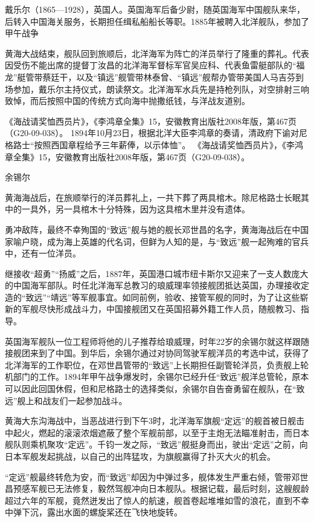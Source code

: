 \documentclass[12pt,UTF8]{ctexbook}
\begin{document}
戴乐尔（1865—1928），英国人。英国海军后备少尉，随英国海军中国舰队来华，后转入中国海关服务，长期担任缉私船船长等职。1885年被聘入北洋舰队，参加了甲午战争

黄海大战结束，舰队回到旅顺后，北洋海军为阵亡的洋员举行了隆重的葬礼。代表因受伤不能出席的提督丁汝昌的北洋海军督标军官吴应科、代表鱼雷艇部队的“福龙”艇管带蔡廷干，以及“镇远”舰管带林泰曾、“镇远”舰帮办管带美国人马吉芬到场参加，戴乐尔主持仪式，朗读祭文。北洋海军水兵先是持枪列队，对空排射三响致悼，而后按照中国的传统方式向海中抛撒纸钱，与洋战友道别。

《海战请奖恤西员片》，《李鸿章全集》15，安徽教育出版社2008年版，第467页（G20-09-038）。
1894年10月23日，根据北洋大臣李鸿章的奏请，清政府下谕对尼格路士“按照西国章程给予三年薪俸，以示体恤”。 《海战请奖恤西员片》，《李鸿章全集》15，安徽教育出版社2008年版，第467页（G20-09-038）。

余锡尔

黄海海战后，在旅顺举行的洋员葬礼上，一共下葬了两具棺木。除尼格路士长眠其中的一具外，另一具棺木十分特殊，因为这具棺木里并没有遗体。

勇冲敌阵，最终不幸殉国的“致远”舰与她的舰长邓世昌的名字，黄海海战后在中国家喻户晓，成为海上英雄的代名词，但鲜为人知的是，与“致远”舰一起殉难的官兵中，还有一位洋员。

继接收“超勇”“扬威”之后，1887年，英国港口城市纽卡斯尔又迎来了一支人数庞大的中国海军部队。时任北洋海军总教习的琅威理率领接舰团抵达英国，办理接收定造的“致远”“靖远”等军舰事宜。如同前例，验收、接管军舰的同时，为了让这些崭新的军舰尽快形成战斗力，中国接舰团又在英国招募外籍工作人员，随舰教习、指导。

英国海军舰队一位工程师将他的儿子推荐给琅威理，时年22岁的余锡尔就这样跟随接舰团来到了中国。到华后，余锡尔通过对协同驾驶军舰洋员的考选中试，获得了北洋海军的工作职位，在邓世昌管带的“致远”上长期担任副管轮洋员，负责舰上轮机部门的工作。1894年甲午战争爆发时，余锡尔已经升任“致远”舰洋总管轮，原本可以因此回国休假，但和尼格路士的选择类似，余锡尔自告奋勇留在舰队，在“致远”舰上和战友们一起参加战斗。

黄海大东沟海战中，当恶战进行到下午3时，北洋海军旗舰“定远”的舰首被日舰击中起火，燃起的滚滚浓烟遮蔽了整个军舰前部，以至于主炮无法瞄准射击，而日本舰队则乘机聚攻“定远”。千钧一发之际，“致远”舰挺身而出，驶出“定远”之前，向日本军舰发起挑战，以自己的出阵猛攻，为旗舰赢得了扑灭大火的机会。

“定远”舰最终转危为安，而“致远”却因为中弹过多，舰体发生严重右倾，管带邓世昌预感军舰已无法修复，毅然驾舰冲向日本舰队。根据记载，最后时刻，这艘舰龄超过六年的军舰，竟然迸发出了惊人的航速，舰首卷起堆堆如雪的浪花，直到不幸中弹下沉，露出水面的螺旋桨还在飞快地旋转。
\end{document}
